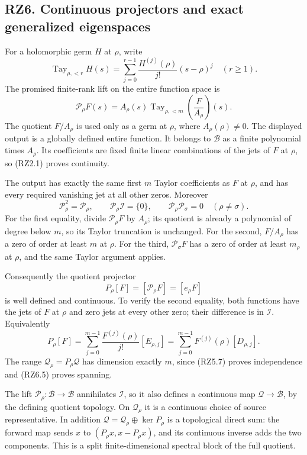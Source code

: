 \documentclass[
]{article}
\begin{document}
\subsection{RZ6. Continuous projectors and exact generalized
eigenspaces}\label{rz6.-continuous-projectors-and-exact-generalized-eigenspaces}

For a holomorphic germ \(H\) at \(\rho\), write \[
\operatorname{Tay}_{\rho,<r}H(s)
=\sum_{j=0}^{r-1}\frac{H^{(j)}(\rho)}{j!}(s-\rho)^j
\quad(r\geq1).
\tag{RZ6.1}
\] The promised finite-rank lift on the entire function space is \[
\boxed{\quad
\mathscr P_\rho F(s)=
A_\rho(s)\operatorname{Tay}_{\rho,<m}
\left(\frac{F}{A_\rho}\right)(s).
\quad}
\tag{RZ6.2}
\] The quotient \(F/A_\rho\) is used only as a germ at \(\rho\), where
\(A_\rho(\rho)\ne0\). The displayed output is a globally defined entire
function. It belongs to \(\mathcal B\) as a finite polynomial times
\(A_\rho\). Its coefficients are fixed finite linear combinations of the
jets of \(F\) at \(\rho\), so (RZ2.1) proves continuity.

The output has exactly the same first \(m\) Taylor coefficients as \(F\)
at \(\rho\), and has every required vanishing jet at all other zeros.
Moreover \[
\mathscr P_\rho^2=\mathscr P_\rho,\qquad
\mathscr P_\rho\mathcal I=\{0\},\qquad
\mathscr P_\rho\mathscr P_\sigma=0\quad(\rho\ne\sigma).
\tag{RZ6.3}
\] For the first equality, divide \(\mathscr P_\rho F\) by \(A_\rho\);
its quotient is already a polynomial of degree below \(m\), so its
Taylor truncation is unchanged. For the second, \(F/A_\rho\) has a zero
of order at least \(m\) at \(\rho\). For the third,
\(\mathscr P_\sigma F\) has a zero of order at least \(m_\rho\) at
\(\rho\), and the same Taylor argument applies.

Consequently the quotient projector \[
P_\rho[F]=[\mathscr P_\rho F]=[e_\rho F]
\tag{RZ6.4}
\] is well defined and continuous. To verify the second equality, both
functions have the jets of \(F\) at \(\rho\) and zero jets at every
other zero; their difference is in \(\mathcal I\). Equivalently \[
P_\rho[F]=
\sum_{j=0}^{m-1}\frac{F^{(j)}(\rho)}{j!}[E_{\rho,j}]
=\sum_{j=0}^{m-1}F^{(j)}(\rho)[D_{\rho,j}].
\tag{RZ6.5}
\] The range \(\mathcal Q_\rho=P_\rho\mathcal Q\) has dimension exactly
\(m\), since (RZ5.7) proves independence and (RZ6.5) proves spanning.

The lift \(\mathscr P_\rho:\mathcal B\to\mathcal B\) annihilates
\(\mathcal I\), so it also defines a continuous map
\(\mathcal Q\to\mathcal B\), by the defining quotient topology. On
\(\mathcal Q_\rho\) it is a continuous choice of source representative.
In addition \(\mathcal Q=\mathcal Q_\rho\oplus\ker P_\rho\) is a
topological direct sum: the forward map sends \(x\) to
\((P_\rho x,x-P_\rho x)\), and its continuous inverse adds the two
components. This is a split finite-dimensional spectral block of the
full quotient.
\end{document}
